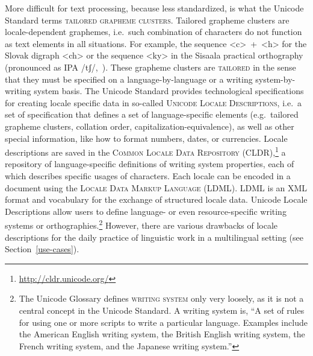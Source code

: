 More difficult for text processing, because less standardized, is what the
Unicode Standard terms \textsc{tailored grapheme clusters}. Tailored grapheme
clusters are locale-dependent graphemes, i.e.~such combination of characters do
not function as text elements in all situations. For example, the sequence <c>~+~<h> for the Slovak digraph <ch> or the sequence <ky> in the Sisaala practical
orthography (pronounced as IPA /tʃ/,~\cite{Moran2006}). These grapheme clusters
are \textsc{tailored} in the sense that they must be specified on a
language-by-language or a writing system-by-writing system basis. The Unicode
Standard provides technological specifications for creating locale specific data
in so-called \textsc{Unicode Locale Descriptions}, i.e.~a set of specification
that defines a set of language-specific elements (e.g.~tailored grapheme
clusters, collation order, capitalization-equivalence), as well as other special
information, like how to format numbers, dates, or currencies. Locale
descriptions are saved in the \textsc{Common Locale Data Repository
(CLDR)},\footnote{\url{http://cldr.unicode.org/}} a repository of
language-specific definitions of writing system properties, each of which
describes specific usages of characters. Each locale can be encoded in a
document using the \textsc{Locale Data Markup Language (LDML)}. LDML is an XML
format and vocabulary for the exchange of structured locale data. Unicode Locale
Descriptions allow users to define language- or even resource-specific writing
systems or orthographies.\footnote{The Unicode Glossary defines \textsc{writing
system} only very loosely, as it is not a central concept in the Unicode
Standard. A writing system is, ``A set of rules for using one or more scripts to
write a particular language. Examples include the American English writing
system, the British English writing system, the French writing system, and the
Japanese writing system.''} However, there are various drawbacks of locale
descriptions for the daily practice of linguistic work in a multilingual setting
(see Section~\ref{use-cases}).